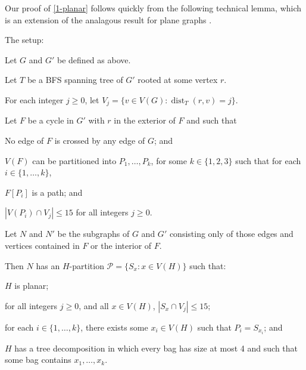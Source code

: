\documentclass{patmorin}
\DeclareMathOperator{\dist}{dist}
\renewcommand{\ge}{\geqslant}
\renewcommand{\le}{\leqslant}
\begin{document}
Our proof of \cref{1-planar} follows quickly from the following technical lemma, which is an extension of the analagous result for plane graphs \cite{dujmovic.joret.ea:planar}.
\begin{lem}
\label{induction} The setup:
  \begin{compactenum}
    \item Let $G$ and $G'$ be defined as above.
    \item Let $T$ be a BFS spanning tree of $G'$ rooted at some vertex $r$.
    \item For each integer $j\ge 0$, let $V_j=\{v\in V(G):\dist_T(r,v)=j\}$. 
    \item Let $F$ be a cycle in $G'$ with $r$ in the exterior of $F$ and such that
    \begin{compactenum} 
      \item No edge of $F$ is crossed by any edge of $G$; and
      \item $V(F)$ can be partitioned into $P_1,\ldots,P_k$, for some $k\in\{1,2,3\}$ such that for each $i\in\{1,\ldots,k\}$,
      \begin{compactenum}
        \item $F[P_i]$ is a path; and
        \item $|V(P_i)\cap V_j| \le 15$ for all integers $j\ge 0$.
      \end{compactenum}
    \end{compactenum}
    \item Let $N$ and $N'$ be the subgraphs of $G$ and $G'$ consisting only of those edges and vertices contained in $F$ or the interior of $F$.
  \end{compactenum}
  Then $N$ has an $H$-partition $\mathcal{P}=\{S_x : x\in V(H)\}$ such that:
  \begin{compactenum}
    \item $H$ is planar;
    \item for all integers $j\ge 0$, and all $x\in V(H)$, $|S_x\cap V_j|\le 15$; 
    \item for each $i\in\{1,\ldots,k\}$, there exists some $x_i\in V(H)$ such that $P_i=S_{x_i}$; and
    \item $H$ has a tree decomposition in which every bag has size at most 4 and such that some bag contains $x_1,\ldots,x_k$.
  \end{compactenum}
\end{lem}
\end{document}
